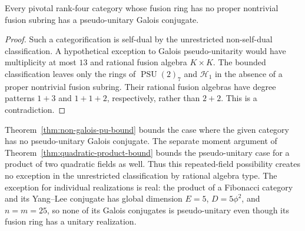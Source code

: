 \begin{corollary}\label{cor:simple-pivotal-galois-pu}
Every pivotal rank-four category whose fusion ring has no proper
nontrivial fusion subring has a pseudo-unitary Galois conjugate.
\end{corollary}
\begin{proof}
Such a categorification is self-dual by the unrestricted non-self-dual
classification. A hypothetical exception to Galois pseudo-unitarity
would have multiplicity at most $13$ and rational fusion algebra
$K\times K$. The bounded classification leaves only the rings of
$\operatorname{PSU}(2)_7$ and $\mathcal H_1$ in the absence of a
proper nontrivial fusion subring. Their rational fusion algebras have
degree patterns $1+3$ and $1+1+2$, respectively, rather than $2+2$.
This is a contradiction.
\end{proof}

\begin{remark}
Theorem~\ref{thm:non-galois-pu-bound} bounds the case where the given
category has no pseudo-unitary Galois conjugate. The separate moment
argument of Theorem~\ref{thm:quadratic-product-bound} bounds the
pseudo-unitary case for a product of two quadratic fields as well.
Thus this repeated-field possibility creates
no exception in the unrestricted classification by rational algebra type.
The exception for individual realizations is real: the product of a
Fibonacci category and its Yang--Lee conjugate has global dimension
$E=5$, $D=5\phi^2$, and $n=m=25$, so none of its Galois conjugates
is pseudo-unitary even though its fusion ring has a unitary realization.
\end{remark}

